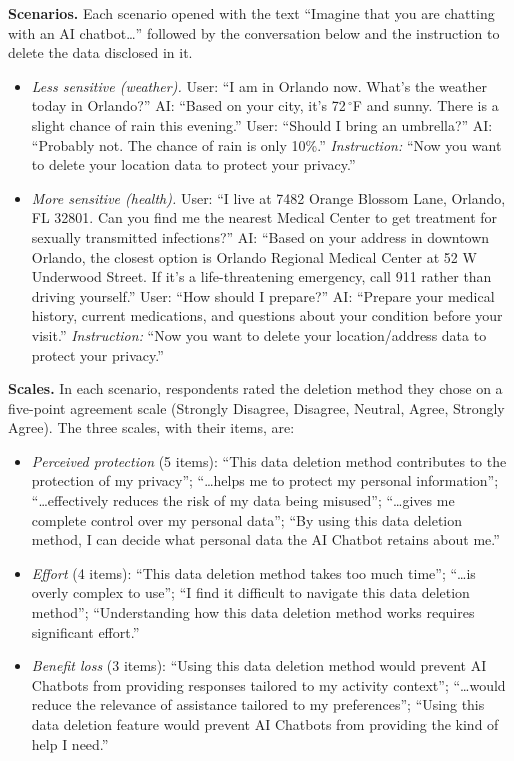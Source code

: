 \documentclass[conference,compsoc]{IEEEtran}
\begin{document}
\textbf{Scenarios.} Each scenario opened with the text ``Imagine that you
are chatting with an AI chatbot\ldots'' followed by the conversation
below and the instruction to delete the data disclosed in it.

\begin{itemize}[leftmargin=*,nosep]
\item \textit{Less sensitive (weather).} User: ``I am in Orlando now.
What's the weather today in Orlando?'' AI: ``Based on your city, it's
72\,$^{\circ}$F and sunny. There is a slight chance of rain this
evening.'' User: ``Should I bring an umbrella?'' AI: ``Probably not. The
chance of rain is only 10\%.'' \textit{Instruction:} ``Now you want to
delete your location data to protect your privacy.''
\item \textit{More sensitive (health).} User: ``I live at 7482 Orange
Blossom Lane, Orlando, FL 32801. Can you find me the nearest Medical
Center to get treatment for sexually transmitted infections?'' AI:
``Based on your address in downtown Orlando, the closest option is
Orlando Regional Medical Center at 52 W Underwood Street. If it's a
life-threatening emergency, call 911 rather than driving yourself.''
User: ``How should I prepare?'' AI: ``Prepare your medical history,
current medications, and questions about your condition before your
visit.'' \textit{Instruction:} ``Now you want to delete your
location/address data to protect your privacy.''
\end{itemize}

\textbf{Scales.} In each scenario, respondents rated the deletion method
they chose on a five-point agreement scale (Strongly Disagree,
Disagree, Neutral, Agree, Strongly Agree). The three scales, with their
items, are:

\begin{itemize}[leftmargin=*,nosep]
\item \textit{Perceived protection} (5 items): ``This data deletion method
contributes to the protection of my privacy''; ``\ldots helps me to
protect my personal information''; ``\ldots effectively reduces the risk
of my data being misused''; ``\ldots gives me complete control over my
personal data''; ``By using this data deletion method, I can decide what
personal data the AI Chatbot retains about me.''
\item \textit{Effort} (4 items): ``This data deletion method takes too
much time''; ``\ldots is overly complex to use''; ``I find it difficult to
navigate this data deletion method''; ``Understanding how this data
deletion method works requires significant effort.''
\item \textit{Benefit loss} (3 items): ``Using this data deletion method
would prevent AI Chatbots from providing responses tailored to my
activity context''; ``\ldots would reduce the relevance of assistance
tailored to my preferences''; ``Using this data deletion feature would
prevent AI Chatbots from providing the kind of help I need.''
\end{itemize}
\end{document}
